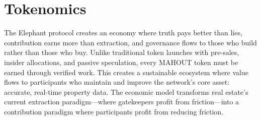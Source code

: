 \chapter{Tokenomics}

The Elephant protocol creates an economy where truth pays better than lies, contribution earns more than extraction, and governance flows to those who build rather than those who buy. Unlike traditional token launches with pre-sales, insider allocations, and passive speculation, every MAHOUT token must be earned through verified work. This creates a sustainable ecosystem where value flows to participants who maintain and improve the network's core asset: accurate, real-time property data. The economic model transforms real estate's current extraction paradigm—where gatekeepers profit from friction—into a contribution paradigm where participants profit from reducing friction.

